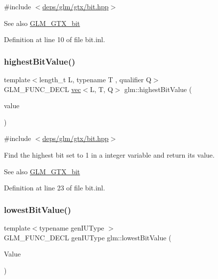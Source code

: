 {\ttfamily \#include $<$\hyperlink{bit_8hpp}{deps/glm/gtx/bit.\+hpp}$>$}

\begin{DoxySeeAlso}{See also}
\hyperlink{group__gtx__bit}{G\+L\+M\+\_\+\+G\+T\+X\+\_\+bit} 
\end{DoxySeeAlso}


Definition at line 10 of file bit.\+inl.

\mbox{\label{group__gtx__bit_ga898ef075ccf809a1e480faab48fe96bf}} 
\subsubsection{\texorpdfstring{highest\+Bit\+Value()}{highestBitValue()}\hspace{0.1cm}{\footnotesize\ttfamily [2/2]}}
{\footnotesize\ttfamily template$<$length\+\_\+t L, typename T , qualifier Q$>$ \\
G\+L\+M\+\_\+\+F\+U\+N\+C\+\_\+\+D\+E\+CL \hyperlink{structglm_1_1vec}{vec}$<$L, T, Q$>$ glm\+::highest\+Bit\+Value (\begin{DoxyParamCaption}\item[{\hyperlink{structglm_1_1vec}{vec}$<$ L, T, Q $>$ const \&}]{value }\end{DoxyParamCaption})}



{\ttfamily \#include $<$\hyperlink{bit_8hpp}{deps/glm/gtx/bit.\+hpp}$>$}

Find the highest bit set to 1 in a integer variable and return its value.

\begin{DoxySeeAlso}{See also}
\hyperlink{group__gtx__bit}{G\+L\+M\+\_\+\+G\+T\+X\+\_\+bit} 
\end{DoxySeeAlso}


Definition at line 23 of file bit.\+inl.

\mbox{\label{group__gtx__bit_ga2ff6568089f3a9b67f5c30918855fc6f}} 
\subsubsection{\texorpdfstring{lowest\+Bit\+Value()}{lowestBitValue()}}
{\footnotesize\ttfamily template$<$typename gen\+I\+U\+Type $>$ \\
G\+L\+M\+\_\+\+F\+U\+N\+C\+\_\+\+D\+E\+CL gen\+I\+U\+Type glm\+::lowest\+Bit\+Value (\begin{DoxyParamCaption}\item[{gen\+I\+U\+Type}]{Value }\end{DoxyParamCaption})}



